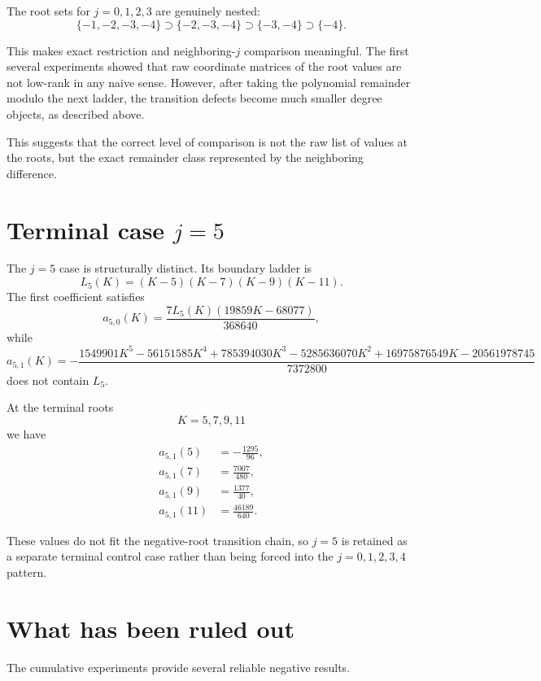 \documentclass[11pt,a4paper]{article}
\begin{document}
The root sets for $j=0,1,2,3$ are genuinely nested:
\[
\{-1,-2,-3,-4\}
\supset
\{-2,-3,-4\}
\supset
\{-3,-4\}
\supset
\{-4\}.
\]

This makes exact restriction and neighboring-$j$ comparison meaningful. The first several experiments showed that raw coordinate matrices of the root values are not low-rank in any naive sense.
However, after taking the polynomial remainder modulo the next ladder, the transition defects become much smaller degree objects, as described above.

This suggests that the correct level of comparison is not the raw list of values at the roots, but the exact remainder class represented by the neighboring difference.

\section{Terminal case $j=5$}

The $j=5$ case is structurally distinct. Its boundary ladder is
\[
L_5(K)=(K-5)(K-7)(K-9)(K-11).
\]
The first coefficient satisfies
\[
a_{5,0}(K)
=\frac{7L_5(K)(19859K-68077)}{368640},
\]
while
\[
a_{5,1}(K)
= -\frac{1549901K^5-56151585K^4+785394030K^3-5285636070K^2+16975876549K-20561978745}{7372800}
\]
does not contain $L_5$.

At the terminal roots
\[
K=5,7,9,11
\]
we have
\begin{align}
a_{5,1}(5)&=-\frac{1295}{96},\\
a_{5,1}(7)&=\frac{7007}{480},\\
a_{5,1}(9)&=\frac{1377}{40},\\
a_{5,1}(11)&=\frac{46189}{640}.
\end{align}

These values do not fit the negative-root transition chain, so $j=5$ is retained as a separate terminal control case rather than being forced into the $j=0,1,2,3,4$ pattern.

\section{What has been ruled out}

The cumulative experiments provide several reliable negative results.
\end{document}

